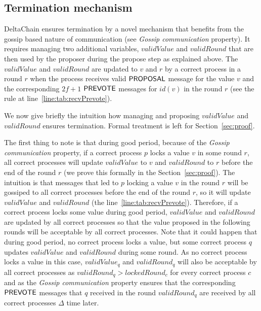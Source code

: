 \subsection{Termination mechanism}

DeltaChain ensures termination by a novel mechanism that benefits from the
gossip based nature of communication (see \emph{Gossip communication}
property).  It requires managing two additional variables, $validValue$ and
$validRound$ that are then used by the proposer during the propose step as
explained above.   The $validValue$ and $validRound$ are updated to $v$ and $r$
by a correct process in a round $r$ when the process receives valid $\mathsf{PROPOSAL}$
message for the value $v$ and the corresponding $2f+1$ $\mathsf{PREVOTE}$ messages for
$id(v)$ in the round $r$ (see the rule at line~\ref{line:tab:recvPrevote}).

We now give briefly the intuition how managing and proposing $validValue$
and $validRound$ ensures termination. Formal treatment is left for
Section~\ref{sec:proof}.  

The first thing to note is that during good period, because of the
\emph{Gossip communication} property, if a correct process $p$ locks a value
$v$ in some round $r$, all correct processes will update $validValue$ to $v$
and $validRound$ to $r$ before the end of the round $r$ (we prove this formally
in the Section~\ref{sec:proof}). The intuition is that messages that led to $p$
locking a value $v$ in the round $r$ will be gossiped to all correct processes
before the end of the round $r$, so it will update $validValue$ and
$validRound$ (the line~\ref{line:tab:recvPrevote}). Therefore, if a correct
process locks some value during good period, $validValue$ and $validRound$ are
updated by all correct processes so that the value proposed in the following
rounds will be acceptable by all correct processes. Note 
that it could happen that during good period, no correct process locks a value,
but some correct process $q$ updates $validValue$ and $validRound$ during some
round. As no correct process locks a value in this case, $validValue_q$ and
$validRound_q$ will also be acceptable by all correct processes as
$validRound_q > lockedRound_c$ for every correct process $c$ and as the
\emph{Gossip communication} property ensures that the corresponding $\mathsf{PREVOTE}$
messages that $q$ received in the round $validRound_q$ are received by all
correct processes $\Delta$ time later. 

